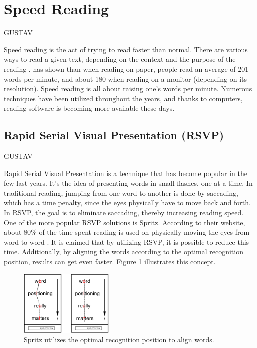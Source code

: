 \section{Speed Reading}
GUSTAV

Speed reading is the act of trying to read faster than normal. There are various ways to read a given text, depending on the context and the purpose of the reading \cite{differentWaysOfReading}.  has shown than when reading on paper, people read an average of 201 words per minute, and about 180 when reading on a monitor (depending on its resolution). Speed reading is all about raising one's words per minute. Numerous techniques have been utilized throughout the years, and  thanks to computers, reading software is becoming more available these days.


\subsection{Rapid Serial Visual Presentation (RSVP)}
GUSTAV

Rapid Serial Visual Presentation is a technique that has become popular in the few last years. It's the idea of presenting words in small flashes, one at a time. In traditional reading, jumping from one word to another is done by saccading, which has a time penalty, since the eyes physically have to move back and forth. In RSVP, the goal is to eliminate saccading, thereby increasing reading speed. One of the more popular RSVP solutions is Spritz. According to their website, about 80\% of the time spent reading is used on physically moving the eyes from word to word \cite{spritz}.	It is claimed that by utilizing RSVP, it is possible to reduce this time. Additionally, by aligning the words according to the optimal recognition position, results can get even faster. Figure \ref{fig:spritz_orp} illustrates this concept.

\begin{figure}[htbp]
\centering
\includegraphics[width=0.4\textwidth]{Pics/opr_spritz}
\caption{Spritz utilizes the optimal recognition position to align words.}
\label{fig:spritz_orp}
\end{figure}

